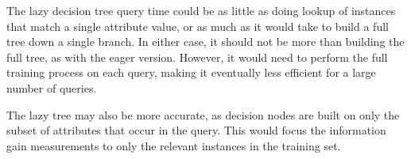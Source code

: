 \documentclass[10pt,letter]{article}
\begin{document}
The lazy decision tree query time could be as little as doing lookup of instances that match a single attribute value, or as much as it would take to build a full tree down a single branch. In either case, it should not be more than building the full tree, as with the eager version. However, it would need to perform the full training process on each query, making it eventually less efficient for a large number of queries.

The lazy tree may also be more accurate, as decision nodes are built on only the subset of attributes that occur in the query. This would focus the information gain measurements to only the relevant instances in the training set.
\end{document}

